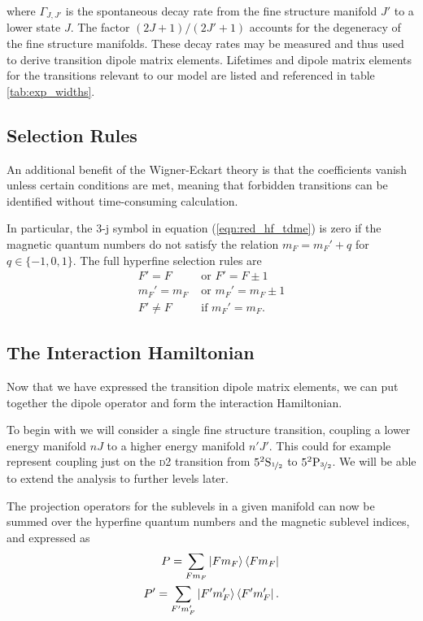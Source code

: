     where $\Gamma_{J, J'}$ is the spontaneous decay rate from the fine structure
    manifold $J'$ to a lower state $J$. The factor $(2J + 1)/(2 J' + 1)$
    accounts for the degeneracy of the fine structure manifolds. These decay
    rates may be measured and thus used to derive transition dipole
    matrix elements. Lifetimes and dipole matrix elements for the transitions
    relevant to our model are listed and referenced in table
    \ref{tab:exp_widths}.

  \subsection{Selection Rules}

    An additional benefit of the Wigner-Eckart theory is that the coefficients
    vanish unless certain conditions are met, meaning that forbidden transitions
    can be identified without time-consuming calculation.

    In particular, the 3-j symbol in equation (\ref{eqn:red_hf_tdme}) is zero
    if the magnetic quantum numbers do not satisfy the relation $m_F = m_F' +
    q$ for $q \in \{ -1, 0, 1\}$. The full hyperfine selection rules are
    \begin{align}
      F' = F &\textrm{~or~} F' = F \pm 1 \nonumber \\
      m_F' = m_F &\textrm{~or~} m_F' = m_F \pm 1 \\
      F' \ne F &\textrm{~if~} m_F' = m_F. \nonumber     
    \end{align}    

  \subsection{The Interaction Hamiltonian}

    Now that we have expressed the transition dipole matrix elements, we can put
    together the dipole operator and form the interaction Hamiltonian.

    To begin with we will consider a single fine structure transition, coupling
    a lower energy manifold $nJ$ to a higher energy manifold $n'J'$. This could
    for example represent coupling just on the \textsc{d2} transition from
    $5^2\rm{S}_{\nicefrac{1}{2}}$ to $5^2\rm{P}_{\nicefrac{3}{2}}$.
    We will be able to extend the analysis to further levels later.

    The projection operators for the sublevels in a given manifold can now be
    summed over the hyperfine quantum numbers and the magnetic sublevel indices,
    and expressed as
    \begin{align}
      P = \sum_{F m_F} \Ket{F m_F} \Bra{F m_F} \nonumber \\
      P' = \sum_{F' m'_F} \Ket{F' m'_F} \Bra{F' m'_F}.
      \label{eqn:hf_projection}
    \end{align}

